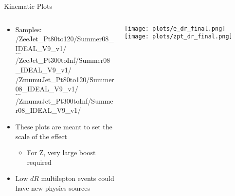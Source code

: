 \documentclass{beamer}
\begin{document}
\begin{frame}{Kinematic Plots}
  \begin{columns}
    \begin{column}{6cm}%
      \vspace{-1cm}
      \begin{itemize}
      \item Samples: \\ {\tiny{/ZeeJet\_Pt80to120/Summer08\_IDEAL\_V9\_v1/} \\ \normalsize{$\cdots$} \\ \vspace{-0.1cm}\tiny{/ZeeJet\_Pt300toInf/Summer08\_IDEAL\_V9\_v1/}}
        \\ {\tiny{/ZmumuJet\_Pt80to120/Summer08\_IDEAL\_V9\_v1/} \\ \normalsize{$\cdots$} \\ \vspace{-0.1cm}\tiny{/ZmumuJet\_Pt300toInf/Summer08\_IDEAL\_V9\_v1/}}
        \bigskip
      \item These plots are meant to set the scale of the effect
        \begin{itemize}
        \item For Z, very large boost required
        \end{itemize}
        \item Low $dR$ multilepton events could have new physics sources
      \end{itemize}
    \end{column}
    
    \begin{column}{6cm}
      \texttt{[image: plots/e\_dr\_final.png]}
      \vspace{-0.cm}
      \texttt{[image: plots/zpt\_dr\_final.png]} %
    \end{column}
    
  \end{columns}
\end{frame}
\end{document}

